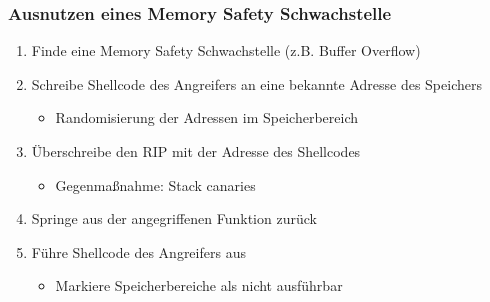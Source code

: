 \subsubsection*{Ausnutzen eines Memory Safety Schwachstelle}
\begin{enumerate}
    \item Finde eine Memory Safety Schwachstelle (z.B. Buffer Overflow)
    \item Schreibe Shellcode des Angreifers an eine bekannte Adresse des Speichers
    \begin{itemize}
        \item Randomisierung der Adressen im Speicherbereich
    \end{itemize}
    \item Überschreibe den RIP mit der Adresse des Shellcodes
    \begin{itemize}
        \item Gegenmaßnahme: Stack canaries
    \end{itemize}
    \item Springe aus der angegriffenen Funktion zurück
    \item Führe Shellcode des Angreifers aus
    \begin{itemize}
        \item Markiere Speicherbereiche als nicht ausführbar
    \end{itemize}
\end{enumerate}
